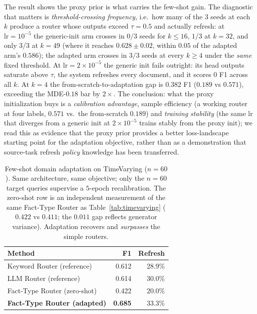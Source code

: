 \documentclass[pdflatex,sn-basic]{sn-jnl}
\begin{document}
The result shows the proxy prior is what carries the few-shot gain. The diagnostic that matters is \emph{threshold-crossing frequency}, i.e.\ how many of the $3$ seeds at each $k$ produce a router whose outputs exceed $\tau{=}0.5$ and actually refresh: at $\mathrm{lr}{=}10^{-5}$ the generic-init arm crosses in $0/3$ seeds for $k{\le}16$, $1/3$ at $k{=}32$, and only $3/3$ at $k{=}49$ (where it reaches $0.628 \pm 0.02$, within $0.05$ of the adapted arm's $0.586$); the adapted arm crosses in $3/3$ seeds at every $k{\ge}4$ under the \emph{same} fixed threshold. At $\mathrm{lr}{=}2{\times}10^{-5}$ the generic init fails outright: its head outputs saturate above $\tau$, the system refreshes every document, and it scores $0$ F1 across all $k$. At $k{=}4$ the from-scratch-to-adaptation gap is $0.382$ F1 ($0.189$ vs $0.571$), exceeding the MDE-$0.18$ bar by $2\times$. The conclusion: what the proxy initialization buys is a \emph{calibration advantage}, sample efficiency (a working router at four labels, $0.571$ vs.\ the from-scratch $0.189$) and \emph{training stability} (the same lr that diverges from a generic init at $2{\times}10^{-5}$ trains stably from the proxy init); we read this as evidence that the proxy prior provides a better loss-landscape starting point for the adaptation objective, rather than as a demonstration that source-task refresh \emph{policy} knowledge has been transferred.

\begin{table}[htbp]
\caption{Few-shot domain adaptation on TimeVarying ($n{=}60$). Same architecture, same objective; only the $n{=}60$ target queries supervise a $5$-epoch recalibration. The zero-shot row is an independent measurement of the same Fact-Type Router as Table~\ref{tab:timevarying} ($0.422$ vs $0.411$; the $0.011$ gap reflects generator variance). Adaptation recovers and \emph{surpasses} the simple routers.}
\label{tab:adapt}
\centering
\begin{tabular}{lrr}
\toprule
Method & F1 & Refresh \\
\midrule
Keyword Router (reference) & 0.612 & 28.9\% \\
LLM Router (reference) & 0.614 & 30.0\% \\
Fact-Type Router (zero-shot) & 0.422 & 20.0\% \\
\textbf{Fact-Type Router (adapted)} & \textbf{0.685} & 33.3\% \\
\bottomrule
\end{tabular}
\end{table}
\end{document}
